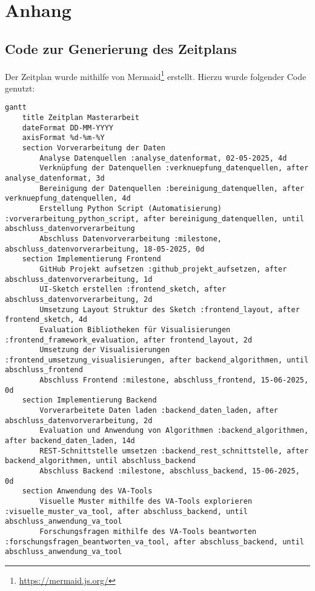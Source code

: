 \chapter{Anhang}

\section{Code zur Generierung des Zeitplans}
Der Zeitplan wurde mithilfe von Mermaid\footnote{\url{https://mermaid.js.org/}} erstellt. Hierzu wurde folgender Code genutzt:

\begin{lstlisting}
gantt
    title Zeitplan Masterarbeit
    dateFormat DD-MM-YYYY
    axisFormat %d-%m-%Y
    section Vorverarbeitung der Daten
        Analyse Datenquellen :analyse_datenformat, 02-05-2025, 4d
        Verknüpfung der Datenquellen :verknuepfung_datenquellen, after analyse_datenformat, 3d
        Bereinigung der Datenquellen :bereinigung_datenquellen, after verknuepfung_datenquellen, 4d
        Erstellung Python Script (Automatisierung) :vorverarbeitung_python_script, after bereinigung_datenquellen, until abschluss_datenvorverarbeitung
        Abschluss Datenvorverarbeitung :milestone, abschluss_datenvorverarbeitung, 18-05-2025, 0d 
    section Implementierung Frontend
        GitHub Projekt aufsetzen :github_projekt_aufsetzen, after abschluss_datenvorverarbeitung, 1d
        UI-Sketch erstellen :frontend_sketch, after abschluss_datenvorverarbeitung, 2d
        Umsetzung Layout Struktur des Sketch :frontend_layout, after frontend_sketch, 4d
        Evaluation Bibliotheken für Visualisierungen :frontend_framework_evaluation, after frontend_layout, 2d
        Umsetzung der Visualisierungen :frontend_umsetzung_visualisierungen, after backend_algorithmen, until abschluss_frontend
        Abschluss Frontend :milestone, abschluss_frontend, 15-06-2025, 0d
    section Implementierung Backend
        Vorverarbeitete Daten laden :backend_daten_laden, after abschluss_datenvorverarbeitung, 2d
        Evaluation und Anwendung von Algorithmen :backend_algorithmen, after backend_daten_laden, 14d
        REST-Schnittstelle umsetzen :backend_rest_schnittstelle, after backend_algorithmen, until abschluss_backend
        Abschluss Backend :milestone, abschluss_backend, 15-06-2025, 0d
    section Anwendung des VA-Tools
        Visuelle Muster mithilfe des VA-Tools explorieren :visuelle_muster_va_tool, after abschluss_backend, until abschluss_anwendung_va_tool
        Forschungsfragen mithilfe des VA-Tools beantworten :forschungsfragen_beantworten_va_tool, after abschluss_backend, until abschluss_anwendung_va_tool

\end{lstlisting}
